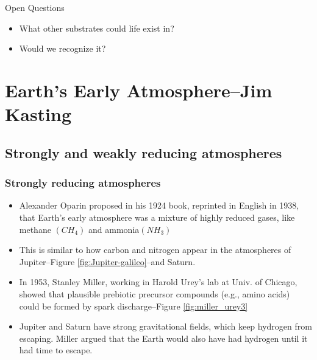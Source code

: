 \documentclass[]{article}
\begin{document}
Open Questions

\begin{itemize}
	\item What other substrates could life exist in?
	\item Would we recognize it?
\end{itemize}

\section[Earth's Early Atmosphere]{Earth's Early Atmosphere--Jim Kasting}

\subsection{Strongly and weakly reducing atmospheres}

\subsubsection{Strongly reducing atmospheres}
\begin{itemize}
	\item Alexander Oparin proposed in his 1924 book, reprinted in English in 1938, that Earth’s early atmosphere was a mixture of highly reduced gases, like methane $(CH_4)$ and ammonia$(NH_3)$\cite{oparin1957origin}
	\item This is similar to how carbon and nitrogen appear in the atmospheres of Jupiter--Figure \ref{fig:Jupiter-galileo}--and Saturn.
	\item In 1953, Stanley Miller, 	working in Harold Urey’s lab at Univ. of Chicago, showed	that plausible prebiotic precursor compounds (e.g.,	amino acids) could be formed by spark discharge\cite{miller1959organic}--Figure \ref{fig:miller_urey3}
	\item Jupiter and Saturn have strong gravitational fields, which keep hydrogen from escaping. Miller argued that the Earth would also have had hydrogen until it had time to escape. 
\end{itemize}
\end{document}
